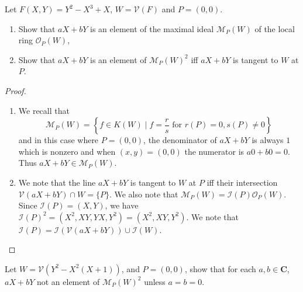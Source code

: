 \documentclass[11pt]{book}
\begin{document}
\begin{problem}
Let $F(X,Y)=Y^2-X^3+X$, $W=\mathcal{V}(F)$ and $P=(0,0)$.
\begin{enumerate}[label=(\alph*)]
	\item Show that $aX+bY$ is an element of the maximal ideal $\mathcal{M}_P(W)$ of the local ring $\mathcal{O}_P(W)$,
	\item Show that $aX+bY$ is an element of $\mathcal{M}_P(W)^2$ iff $aX+bY$ is tangent to $W$ at $P$.
\end{enumerate}
\begin{proof}~\\[-1em]
\begin{enumerate}[label=(\alph*)]
\item We recall that
\[\mathcal{M}_{P}(W)=\left\{f \in K(W) \mid f=\frac{r}{s} \text { for } r(P)=0, s(P) \neq 0\right\}\]
and in this case where $P=(0,0)$, the denominator of $aX+bY$ is always $1$ which is nonzero and when $(x,y)=(0,0)$ the numerator is $a0+b0=0$. Thus $aX+bY\in \mathcal{M}_{P}(W)$. 
\item
We note that the line $aX+bY$ is tangent to $W$ at $P$ iff their intersection $\mathcal{V}(aX+bY)\cap W=\{P\}$. We also note that $\mathcal{M}_P(W)=\mathcal{I}(P)\mathcal{O}_P(W)$. Since $\mathcal{I}(P)=(X,Y)$, we have $\mathcal{I}(P)^2=(X^2,XY,YX,Y^2)=(X^2,XY,Y^2)$. We note that $\mathcal{I}(P)=\mathcal{I}(\mathcal{V}(aX+bY))\cup\mathcal{I}(W)$.
\end{enumerate}
\end{proof}
\end{problem}
\begin{problem}Let $W=\mathcal{V}(Y^2-X^2(X+1))$, and $P=(0,0)$, show that for each $a,b\in\mathbf C$, $aX+bY$ not an element of $\mathcal{M}_P(W)^2$ unless $a=b=0$.
\end{problem}
\end{document}
